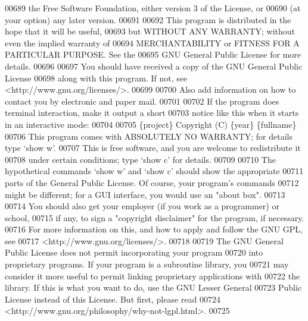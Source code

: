 \begin{DoxyCode}
00689     the Free Software Foundation, either version 3 of the License, or
00690     (at your option) any later version.
00691 
00692     This program is distributed in the hope that it will be useful,
00693     but WITHOUT ANY WARRANTY; without even the implied warranty of
00694     MERCHANTABILITY or FITNESS FOR A PARTICULAR PURPOSE.  See the
00695     GNU General Public License for more details.
00696 
00697     You should have received a copy of the GNU General Public License
00698     along with this program.  If not, see <http://www.gnu.org/licenses/>.
00699 
00700 Also add information on how to contact you by electronic and paper mail.
00701 
00702   If the program does terminal interaction, make it output a short
00703 notice like this when it starts in an interactive mode:
00704 
00705     \{project\}  Copyright (C) \{year\}  \{fullname\}
00706     This program comes with ABSOLUTELY NO WARRANTY; for details type `show w'.
00707     This is free software, and you are welcome to redistribute it
00708     under certain conditions; type `show c' for details.
00709 
00710 The hypothetical commands `show w' and `show c' should show the appropriate
00711 parts of the General Public License.  Of course, your program's commands
00712 might be different; for a GUI interface, you would use an "about box".
00713 
00714   You should also get your employer (if you work as a programmer) or school,
00715 if any, to sign a "copyright disclaimer" for the program, if necessary.
00716 For more information on this, and how to apply and follow the GNU GPL, see
00717 <http://www.gnu.org/licenses/>.
00718 
00719   The GNU General Public License does not permit incorporating your program
00720 into proprietary programs.  If your program is a subroutine library, you
00721 may consider it more useful to permit linking proprietary applications with
00722 the library.  If this is what you want to do, use the GNU Lesser General
00723 Public License instead of this License.  But first, please read
00724 <http://www.gnu.org/philosophy/why-not-lgpl.html>.
00725 
\end{DoxyCode}
